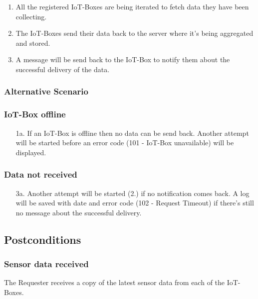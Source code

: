 \documentclass[notitlepage]{article}
\begin{document}
\begin{enumerate}
	\item All the registered IoT-Boxes are being iterated to fetch data they have been collecting.
	      
	\item The IoT-Boxes send their data back to the server where it's being aggregated and stored.
	      
	\item A message will be send back to the IoT-Box to notify them about the successful delivery of the data.
\end{enumerate}

\subsubsection{Alternative Scenario}
\subsubsection*{IoT-Box offline}

\begin{enumerate}
	\item[1a.]{If an IoT-Box is offline then no data can be send back. Another attempt will be started before an error code (101 - IoT-Box unavailable) will be displayed.}
\end{enumerate}

\subsubsection*{Data not received}

\begin{enumerate}
	\item[3a.]{Another attempt will be started (2.) if no notification comes back. A log will be saved with date and error code (102 - Request Timeout) if there's still no message about the successful delivery.}
\end{enumerate}

\subsection{Postconditions}

\subsubsection{Sensor data received}
The Requester receives a copy of the latest sensor data from each of the IoT-Boxes.
\end{document}
